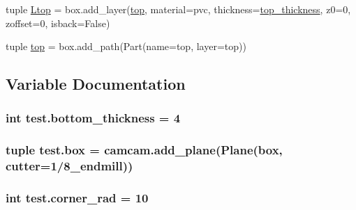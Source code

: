 \begin{DoxyCompactItemize}
\item 
tuple \hyperlink{namespacetest_aa7b8aa9411311181f994be4bcdb6d3c5}{Ltop} = box.\+add\+\_\+layer(\textquotesingle{}\hyperlink{namespacetest_a1dd0e7d10f3a46b2584c07bed8bc4ab8}{top}\textquotesingle{}, material=\textquotesingle{}pvc\textquotesingle{}, thickness=\hyperlink{namespacetest_a1f1f1b6d0fb7ae6cb8e0d7a823825e8d}{top\+\_\+thickness}, z0=0, zoffset=0, isback=False)
\item 
tuple \hyperlink{namespacetest_a1dd0e7d10f3a46b2584c07bed8bc4ab8}{top} = box.\+add\+\_\+path(Part(name=\textquotesingle{}top\textquotesingle{}, layer=\textquotesingle{}top\textquotesingle{}))
\end{DoxyCompactItemize}


\subsection{Variable Documentation}
\hypertarget{namespacetest_a10f54c7f8dd77a534e788bf487ff2b1a}{}
\subsubsection[{bottom\+\_\+thickness}]{\setlength{\rightskip}{0pt plus 5cm}int test.\+bottom\+\_\+thickness = 4}\label{namespacetest_a10f54c7f8dd77a534e788bf487ff2b1a}
\hypertarget{namespacetest_a216fdd5fd8b05a73731fd5eadfc278dc}{}
\subsubsection[{box}]{\setlength{\rightskip}{0pt plus 5cm}tuple test.\+box = camcam.\+add\+\_\+plane(Plane(\textquotesingle{}box\textquotesingle{}, cutter=\textquotesingle{}1/8\+\_\+endmill\textquotesingle{}))}\label{namespacetest_a216fdd5fd8b05a73731fd5eadfc278dc}
\hypertarget{namespacetest_a0f7c1b1c2817d5785aa0407879366227}{}
\subsubsection[{corner\+\_\+rad}]{\setlength{\rightskip}{0pt plus 5cm}int test.\+corner\+\_\+rad = 10}\label{namespacetest_a0f7c1b1c2817d5785aa0407879366227}
\hypertarget{namespacetest_a0981d504d028598d82644c006c420453}{}
